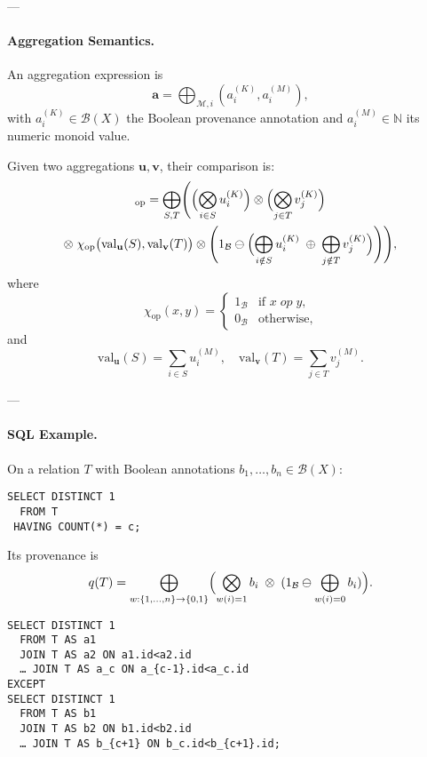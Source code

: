 ---

\paragraph{Aggregation Semantics.}  
An aggregation expression is
\[
\mathbf{a}=\bigoplus_{\mathcal{M},i}(a_i^{(K)},a_i^{(M)}),
\]
with \(a_i^{(K)}\in\mathcal{B}(X)\) the Boolean provenance annotation and \(a_i^{(M)}\in\mathbb{N}\) its numeric monoid value.  

Given two aggregations \(\mathbf{u},\mathbf{v}\), their comparison is:
\begin{multline}
[\mathbf{u}\oslash \mathbf{v}]_{\mathrm{op}}=
\bigoplus_{S,T}
\Biggl(
\Bigl(\bigotimes_{i\in S}u_i^{(K)}\Bigr)
\otimes
\Bigl(\bigotimes_{j\in T}v_j^{(K)}\Bigr) \\
\otimes\;\chi_{\mathrm{op}}\bigl(\mathrm{val}_\mathbf{u}(S),\mathrm{val}_\mathbf{v}(T)\bigr)
\otimes
\Biggl(1_{\mathcal{B}}\ominus\Bigl(\bigoplus_{i\notin S}u_i^{(K)}\;\oplus\;\bigoplus_{j\notin T}v_j^{(K)}\Bigr)\Biggr)
\Biggr),
\end{multline}
where
\[
\chi_{\mathrm{op}}(x,y)=
\begin{cases}
1_{\mathcal{B}} & \text{if } x\;\mathit{op}\; y, \\
0_{\mathcal{B}} & \text{otherwise,}
\end{cases}
\]
and
\[
\mathrm{val}_\mathbf{u}(S)=\sum_{i\in S}u_i^{(M)},\quad
\mathrm{val}_\mathbf{v}(T)=\sum_{j\in T}v_j^{(M)}.
\]

---

\paragraph{SQL Example.}  
On a relation \(T\) with Boolean annotations \(b_1,\dots,b_n\in\mathcal{B}(X)\):

\begin{verbatim}
SELECT DISTINCT 1
  FROM T
 HAVING COUNT(*) = c;
\end{verbatim}

Its provenance is
\[
q(T)=\bigoplus_{w:\{1,\dots,n\}\to\{0,1\}}
\Bigl(
\bigotimes_{w(i)=1}b_i
\;\otimes\;
(1_{\mathcal{B}}\ominus\bigoplus_{w(i)=0}b_i)
\Bigr).
\]

\begin{verbatim}
SELECT DISTINCT 1
  FROM T AS a1
  JOIN T AS a2 ON a1.id<a2.id
  … JOIN T AS a_c ON a_{c-1}.id<a_c.id
EXCEPT
SELECT DISTINCT 1
  FROM T AS b1
  JOIN T AS b2 ON b1.id<b2.id
  … JOIN T AS b_{c+1} ON b_c.id<b_{c+1}.id;
\end{verbatim}

